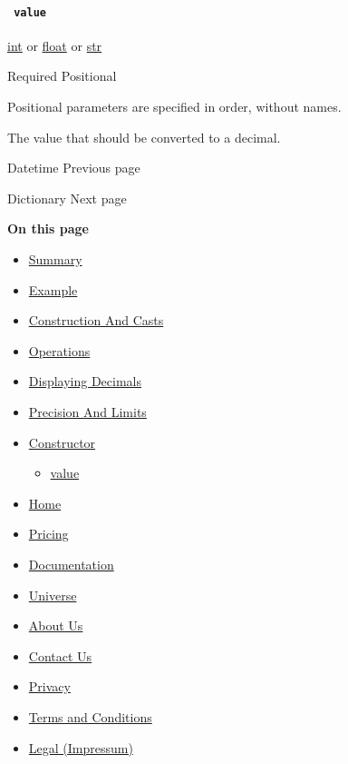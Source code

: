\paragraph{\texorpdfstring{\texttt{\ value\ }}{ value }}\label{constructor-value}

\href{/docs/reference/foundations/int/}{int} {or}
\href{/docs/reference/foundations/float/}{float} {or}
\href{/docs/reference/foundations/str/}{str}

{Required} {{ Positional }}

\label{constructor-value-positional-tooltip}
Positional parameters are specified in order, without names.

The value that should be converted to a decimal.

\href{/docs/reference/foundations/datetime/}{\pandocbounded{}}

{ Datetime } { Previous page }

\href{/docs/reference/foundations/dictionary/}{\pandocbounded{}}

{ Dictionary } { Next page }

\textbf{On this page}

\begin{itemize}
\tightlist
\item
  \hyperref[summary]{Summary}
\item
  \hyperref[example]{Example}
\item
  \hyperref[construction-and-casts]{Construction And Casts}
\item
  \hyperref[operations]{Operations}
\item
  \hyperref[displaying-decimals]{Displaying Decimals}
\item
  \hyperref[precision-and-limits]{Precision And Limits}
\item
  \hyperref[constructor]{Constructor}

  \begin{itemize}
  \tightlist
  \item
    \hyperref[constructor-value]{value}
  \end{itemize}
\end{itemize}

\begin{itemize}
\tightlist
\item
  \href{/}{Home}
\item
  \href{/pricing/}{Pricing}
\item
  \href{/docs/}{Documentation}
\item
  \href{/universe/}{Universe}
\item
  \href{/about/}{About Us}
\item
  \href{/contact/}{Contact Us}
\item
  \href{/privacy/}{Privacy}
\item
  \href{https://typst.app/terms}{Terms and Conditions}
\item
  \href{/legal/}{Legal (Impressum)}
\end{itemize}

